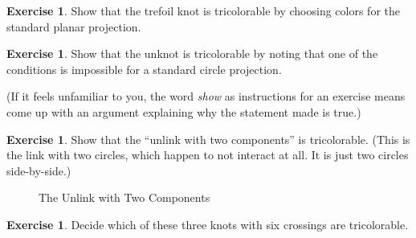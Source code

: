 \documentclass[12pt,letterpaper]{article}
\theoremstyle{definition}
\newtheorem{exercise}[question]{Exercise}
\begin{document}
\begin{exercise}
Show that the trefoil knot is tricolorable by choosing colors for the standard planar projection.
\end{exercise}

\begin{exercise}
Show that the unknot is tricolorable by noting that one of the conditions is impossible for a standard circle projection.
\end{exercise}

(If it feels unfamiliar to you, the word \emph{show} as instructions for an exercise means come up with an argument explaining why the statement made is true.)

\begin{exercise}
Show that the ``unlink with two components'' is tricolorable.
(This is the link with two circles, which happen to not interact at all. 
It is just two circles side-by-side.)
\end{exercise}

\begin{figure}[h]
    \centering
    \caption{The Unlink with Two Components}
\end{figure}




\clearpage

\begin{exercise}
Decide which of these three knots with six crossings are tricolorable.
\end{exercise}
\end{document}
